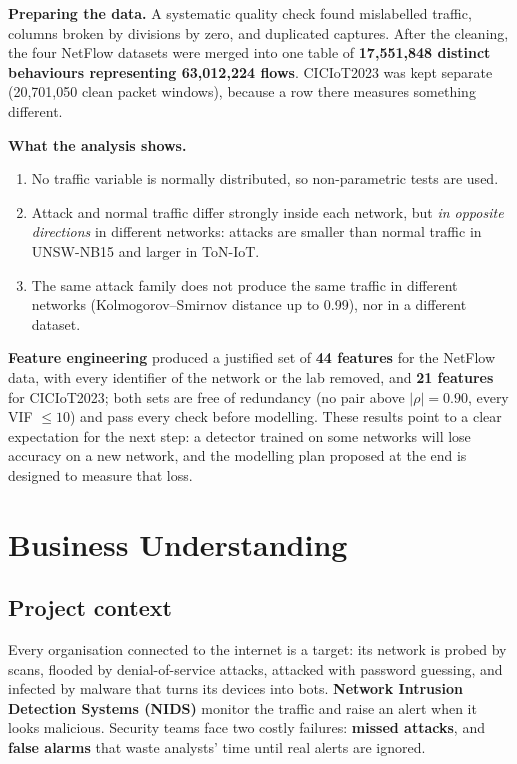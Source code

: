 \documentclass[12pt,a4paper]{article}
\begin{document}
\textbf{Preparing the data.} A systematic quality check found mislabelled traffic, columns broken by divisions by
zero, and duplicated captures. After the cleaning, the four NetFlow datasets were merged into one table of
\textbf{17,551,848 distinct behaviours representing 63,012,224 flows}. CICIoT2023 was kept separate (20,701,050 clean
packet windows), because a row there measures something different.

\textbf{What the analysis shows.}
\begin{enumerate}
  \item No traffic variable is normally distributed, so non-parametric tests are used.
  \item Attack and normal traffic differ strongly inside each network, but \emph{in opposite directions} in different
        networks: attacks are smaller than normal traffic in UNSW-NB15 and larger in ToN-IoT.
  \item The same attack family does not produce the same traffic in different networks (Kolmogorov--Smirnov distance
        up to 0.99), nor in a different dataset.
\end{enumerate}

\textbf{Feature engineering} produced a justified set of \textbf{44 features} for the NetFlow data, with every
identifier of the network or the lab removed, and \textbf{21 features} for CICIoT2023; both sets are free of
redundancy (no pair above $|\rho| = 0.90$, every VIF $\leq 10$) and pass every check before modelling. These results point to a
clear expectation for the next step: a detector trained on some networks will lose accuracy on a new network, and
the modelling plan proposed at the end is designed to measure that loss.

\newpage
{\setlength{\parskip}{0pt}\small\tableofcontents}
\newpage

\section{Business Understanding}

\subsection{Project context}
Every organisation connected to the internet is a target: its network is probed by scans, flooded by
denial-of-service attacks, attacked with password guessing, and infected by malware that turns its devices into bots.
\textbf{Network Intrusion Detection Systems (NIDS)} monitor the traffic and raise an alert when it looks malicious.
Security teams face two costly failures: \textbf{missed attacks}, and \textbf{false alarms} that waste analysts' time
until real alerts are ignored.
\end{document}
